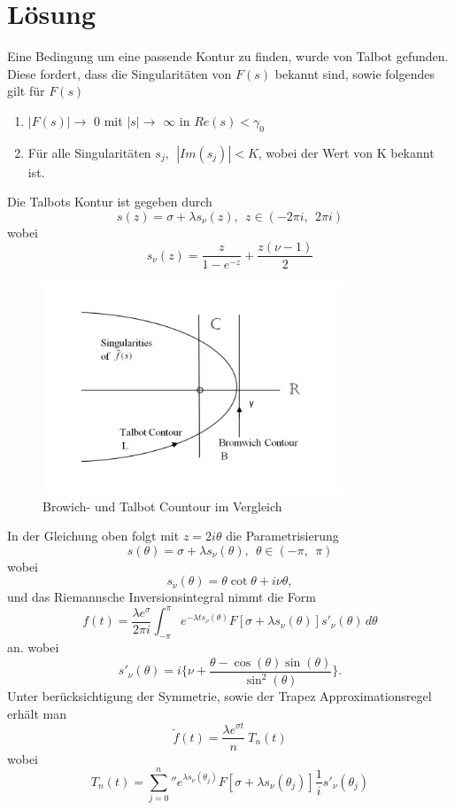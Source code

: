 %
%
%


\section{Lösung}
\label{laplace:section:Methode nach Talbot}
Eine Bedingung um eine passende Kontur zu finden, wurde von Talbot gefunden.
Diese fordert, dass die Singularitäten von $F(s)$ bekannt sind, sowie folgendes gilt für $F(s)$
\begin{enumerate}
\item
$|F(s)|\rightarrow$ 0 mit $|s|\rightarrow$ $\infty$ in $Re(s)<\gamma_{0}$
\item
Für alle Singularitäten $s_{j},~~|Im(s_{j})|<K$, wobei der Wert von K bekannt ist.
\end{enumerate}
Die Talbots Kontur ist gegeben durch
\[
s(z) = \sigma+\lambda s_{\nu}(z),~~ z\in (-2\pi i,~~2\pi i)
\]
wobei
\[
s_{\nu}(z)=\frac{z}{1-e^{-z}}+\frac{z(\nu-1)}{2}
\]
\begin{figure}
\centering
\includegraphics[width=0.8\textwidth]{papers/laplace/Bromwich_Talbot_Contour.PNG}
\caption{Browich- und Talbot Countour im Vergleich
\label{laplace:figure:countours}}
\end{figure}

In der Gleichung oben folgt mit $z=2i\theta$ die Parametrisierung
\[
s(\theta) = \sigma+\lambda s_{\nu}(\theta),~~ \theta\in (-\pi ,~~\pi)
\]
wobei
\[
s_{\nu}(\theta)=\theta \cot\theta+i\nu\theta,
\]
und das Riemannsche Inversionsintegral nimmt die Form 
\[
f(t)=\frac{\lambda e^{\sigma}}{2\pi i}\int_{-\pi}^{\pi} e^{-\lambda ts_{\nu}(\theta)}F[\sigma + \lambda s_{\nu}(\theta)]s'_{\nu}(\theta)\,d\theta
\]
an.
wobei
\[
s'_{\nu}(\theta) = i \Biggl\{\nu + \frac{\theta-\cos(\theta)\sin(\theta)}{\sin^{2}(\theta)}  \Biggr\}.
\]
Unter berücksichtigung der Symmetrie, sowie der Trapez Approximationsregel erhält man
\[
\tilde{f}(t) = \frac{\lambda e^{\sigma t}}{n}~T_{n}(t)
\]
wobei 
\[
T_{n}(t)
=
{\sum_{j=0}^n}'' e^{\lambda s_{\nu}(\theta_{j})}
F[\sigma + \lambda s_{\nu}(\theta_{j})]
\frac{1}{i} s'_{\nu}(\theta_{j})
\]

